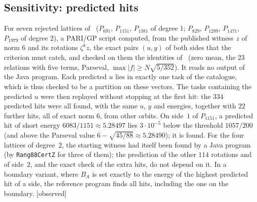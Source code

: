\documentclass[11pt,a4paper]{amsart}
\theoremstyle{plain}
\theoremstyle{definition}
\newcommand{\st}[1]{\textup{\textsf{\small[#1]}}}
\newcommand{\CONS}{\st{observed}}
\begin{document}
\subsection{Sensitivity: predicted hits}
For seven rejected lattices of~\cite[Table~2]{Gau26} ($P_{691}$, $P_{1151}$, $P_{1381}$ of degree $1$; $P_{829}$, $P_{1289}$, $P_{1471}$, $P_{1979}$ of degree $2$), a PARI/GP script computed, from the published witness $z$ of norm $6$ and its rotations $\zeta^kz$, the exact pairs $(u,y)$ of both sides that the criterion must catch, and checked on them the identities of~\cite[\S4]{Gau26} (zero mean, the $23$ relations with five terms, Parseval, $\max|f|\ge N\sqrt{5/352}$). It reads no output of the Java program. Each predicted $u$ lies in exactly one task of the catalogue, which is thus checked to be a partition on these vectors. The tasks containing the predicted $u$ were then replayed without stopping at the first hit: the $334$ predicted hits were all found, with the same $u$, $y$ and energies, together with $22$ further hits, all of exact norm $6$, from other orbits. On side~$1$ of $P_{1151}$, a predicted hit of short energy $6083/1151\approx5.28497$ lies $3\cdot10^{-5}$ below the threshold $1057/200$ (and above the Parseval value $6-\sqrt{45/88}\approx5.28490$); it is found. For the four lattices of degree~$2$, the starting witness had itself been found by a Java program (by \texttt{Rang88CertZ} for three of them); the prediction of the other $114$ rotations and of side~$2$, and the exact check of the extra hits, do not depend on it. In a boundary variant, where $B_A$ is set exactly to the energy of the highest predicted hit of a side, the reference program finds all hits, including the one on the boundary. \CONS
\end{document}
